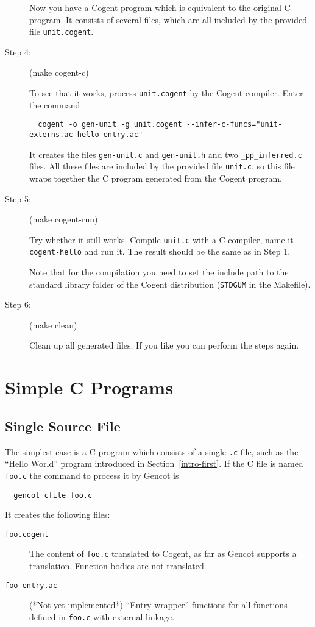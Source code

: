 \documentclass[a4paper]{report}
\newcommand{\code}[1]{\textnormal{\texttt{#1}}}
\begin{document}
\begin{description}
Now you have a Cogent program which is equivalent to the original C program. It consists of several files,
which are all included by the provided file \code{unit.cogent}.

\item[Step 4:] (make cogent-c)

To see that it works, process \code{unit.cogent} by the Cogent compiler. Enter the command
\begin{verbatim}
  cogent -o gen-unit -g unit.cogent --infer-c-funcs="unit-externs.ac hello-entry.ac"
\end{verbatim}
It creates the files \code{gen-unit.c} and \code{gen-unit.h} and two \code{\_pp\_inferred.c} files. All these files
are included by the provided file \code{unit.c}, so this file wraps together the C program generated
from the Cogent program.

\item[Step 5:] (make cogent-run)

Try whether it still works. Compile \code{unit.c} with a C compiler, name it \code{cogent-hello} and run it. The result should be the same
as in Step 1.

Note that for the compilation you need to set the include path to the standard library folder of the Cogent 
distribution (\code{STDGUM} in the Makefile).

\item[Step 6:] (make clean)

Clean up all generated files. If you like you can perform the steps again.
\end{description}

\chapter{Simple C Programs}

\section{Single Source File}
\label{simple-single}

The simplest case is a C program which consists of a single \code{.c} file, such as the ``Hello World'' program
introduced in Section~\ref{intro-first}. If the C file is named \code{foo.c} the command to process it by Gencot is
\begin{verbatim}
  gencot cfile foo.c
\end{verbatim}
It creates the following files:
\begin{description}
\item[\code{foo.cogent}] The content of \code{foo.c} translated to Cogent, as far as Gencot supports a translation.
Function bodies are not translated.
\item[\code{foo-entry.ac}] (*Not yet implemented*) ``Entry wrapper'' functions for all functions defined in \code{foo.c} 
with external linkage.
\end{description}
\end{document}
